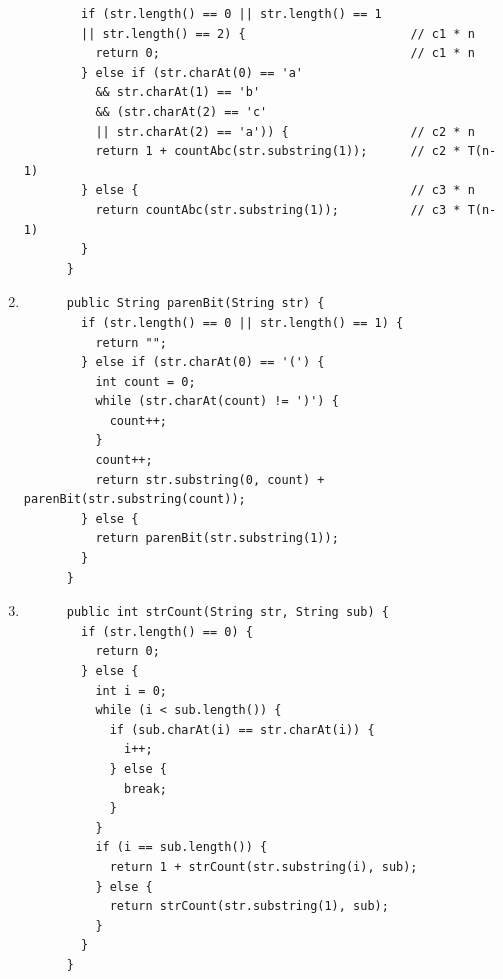 \documentclass[a4paper,12pt]{article}
\begin{document}
\begin{enumerate}
\begin{Verbatim}
        if (str.length() == 0 || str.length() == 1
        || str.length() == 2) {                       // c1 * n
          return 0;                                   // c1 * n
        } else if (str.charAt(0) == 'a'
          && str.charAt(1) == 'b'
          && (str.charAt(2) == 'c'
          || str.charAt(2) == 'a')) {                 // c2 * n
          return 1 + countAbc(str.substring(1));      // c2 * T(n-1)
        } else {                                      // c3 * n
          return countAbc(str.substring(1));          // c3 * T(n-1)
        }
      }
      \end{Verbatim}
      \item \begin{Verbatim}
      public String parenBit(String str) {
        if (str.length() == 0 || str.length() == 1) {
          return "";
        } else if (str.charAt(0) == '(') {
          int count = 0;
          while (str.charAt(count) != ')') {
            count++;
          }
          count++;
          return str.substring(0, count) + parenBit(str.substring(count));
        } else {
          return parenBit(str.substring(1));
        }
      }
      \end{Verbatim}
      \item \begin{Verbatim}
      public int strCount(String str, String sub) {
        if (str.length() == 0) {
          return 0;
        } else {
          int i = 0;
          while (i < sub.length()) {
            if (sub.charAt(i) == str.charAt(i)) {
              i++;
            } else {
              break;
            }
          }
          if (i == sub.length()) {
            return 1 + strCount(str.substring(i), sub);
          } else {
            return strCount(str.substring(1), sub);
          }
        }
      }
      \end{Verbatim}
    \end{enumerate}
\end{document}
